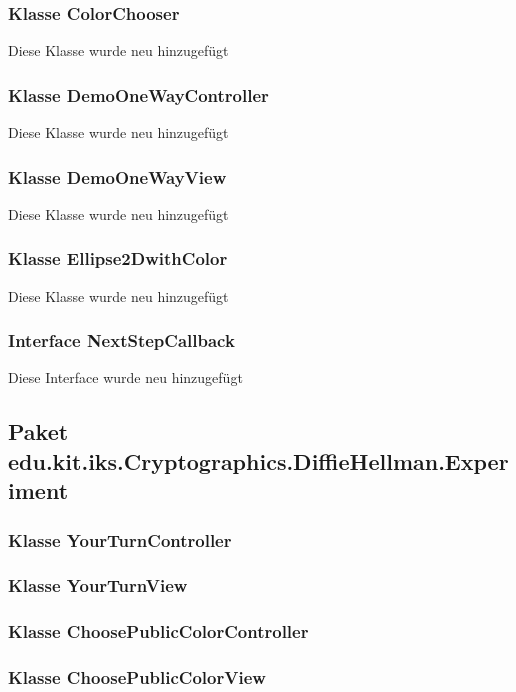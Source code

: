 \documentclass{article}
\begin{document}
	\subsubsection{Klasse ColorChooser}
    Diese Klasse wurde neu hinzugefügt

	\subsubsection{Klasse DemoOneWayController}
    Diese Klasse wurde neu hinzugefügt

	\subsubsection{Klasse DemoOneWayView}
    Diese Klasse wurde neu hinzugefügt

	\subsubsection{Klasse Ellipse2DwithColor}
    Diese Klasse wurde neu hinzugefügt

	\subsubsection{Interface NextStepCallback}
    Diese Interface wurde neu hinzugefügt

  \subsection{Paket edu.kit.iks.Cryptographics.DiffieHellman.Experiment}

	\subsubsection{Klasse YourTurnController}

	\subsubsection{Klasse YourTurnView}

	\subsubsection{Klasse ChoosePublicColorController}

	\subsubsection{Klasse ChoosePublicColorView}
\end{document}
